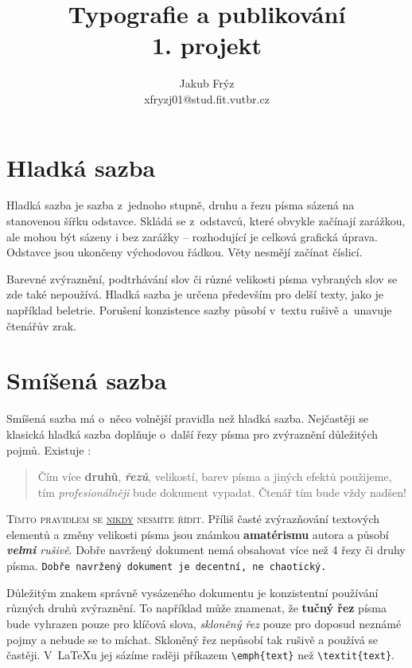 \documentclass[a4paper, twocolumn, 11pt]{article}
\title{Typografie a publikování\\1. projekt}
\author{Jakub Frýz\\xfryzj01@stud.fit.vutbr.cz}
\date{}
\begin{document}
\maketitle

\section{Hladká sazba}

Hladká sazba je sazba z~jednoho stupně, druhu a řezu písma sázená na stanovenou šířku odstavce. Skládá se z~odstavců, které obvykle začínají zarážkou, ale mohou být sázeny i bez zarážky -- rozhodující je celková grafická úprava. Odstavce jsou ukončeny východovou řádkou. Věty nesmějí začínat číslicí.

Barevné zvýraznění, podtrhávání slov či různé velikosti písma vybraných slov se zde také nepoužívá. Hladká sazba je určena především pro delší texty, jako je například beletrie. Porušení konzistence sazby působí v~textu rušivě a~unavuje čtenářův zrak.

\section{Smíšená sazba}

Smíšená sazba má o~něco volnější pravidla než hladká sazba. Nejčastěji se klasická hladká sazba doplňuje o~další řezy písma pro zvýraznění důležitých pojmů. Existuje :

\begin{quotation}
Čím více \textbf{druhů}, \textbf{\textit{řezů}}, {\scriptsize velikostí}, barev písma a jiných efektů použijeme, tím \textit{profesionálněji} bude dokument vypadat. Čtenář tím bude vždy {\Huge nadšen!}
\end{quotation}

\textsc{Tímto pravidlem se \underline{nikdy} nesmíte řídit.} Příliš časté zvýrazňování textových elementů a změny velikosti {\tiny písma} jsou {\LARGE známkou \textbf{amatérismu}} autora a působí \textit{\textbf{velmi} rušivě}. Dobře navržený dokument nemá obsahovat více než 4 řezy či druhy písma. \texttt{Dobře navržený dokument je decentní, ne chaotický.}

Důležitým znakem správně vysázeného dokumentu je konzistentní používání různých druhů zvýraznění. To například může znamenat, že \textbf{tučný řez} písma bude vyhrazen pouze pro klíčová slova, \textit{skloněný řez} pouze pro doposud neznámé pojmy a nebude se to míchat. Skloněný řez nepůsobí tak rušivě a používá se častěji. V~\LaTeX u jej sázíme raději příkazem \verb|\emph{text}| než \verb|\textit{text}|.
\end{document}
